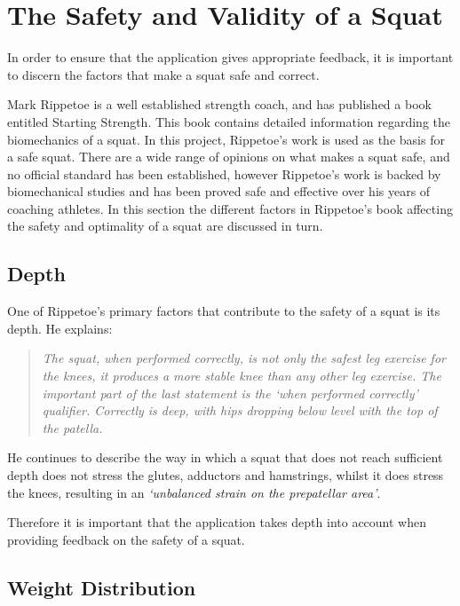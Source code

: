 \section{The Safety and Validity of a Squat}

In order to ensure that the application gives appropriate feedback, it is important to discern the factors that make a squat safe and correct.

Mark Rippetoe is a well established strength coach, and has published a book entitled Starting Strength\cite{startingstrength}. This book contains detailed information regarding the biomechanics of a squat. In this project, Rippetoe's work is used as the basis for a safe squat. There are a wide range of opinions on what makes a squat safe, and no official standard has been established, however Rippetoe's work is backed by biomechanical studies and has been proved safe and effective over his years of coaching athletes. In this section the different factors in Rippetoe's book affecting the safety and optimality of a squat are discussed in turn.

\subsection{Depth}

One of Rippetoe's primary factors that contribute to the safety of a squat is its depth. He explains:

\begin{quote}
\emph{The squat, when performed correctly, is not only the safest leg exercise for the knees, it produces a more stable knee than any other leg exercise. The important part of the last statement is the `when performed correctly' qualifier. Correctly is deep, with hips dropping below level with the 
top of the patella.}
\end{quote}

He continues to describe the way in which a squat that does not reach sufficient depth does not stress the glutes, adductors and hamstrings, whilst it does stress the knees, resulting in an \emph{`unbalanced strain on the prepatellar area'}.

Therefore it is important that the application takes depth into account when providing feedback on the safety of a squat.

\subsection{Weight Distribution}

